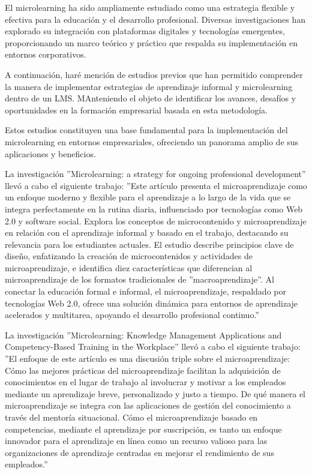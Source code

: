 
El microlearning ha sido ampliamente estudiado como una estrategia flexible y
efectiva para la educación y el desarrollo profesional. Diversas investigaciones
han explorado su integración con plataformas digitales y tecnologías emergentes,
proporcionando un marco teórico y práctico que respalda su implementación en
entornos corporativos.

A continuación, haré mención de estudios previos que han permitido comprender la
manera de implementar estrategias de aprendizaje informal y microlearning dentro
de un LMS. MAnteniendo el objeto de identificar los avances, desafíos y
oportunidades en la formación empresarial basada en esta metodología.

Estos estudios constituyen una base fundamental para la implementación del
microlearning en entornos empresariales, ofreciendo un panorama amplio de sus
aplicaciones y beneficios.

La investigación ''Microlearning: a strategy for ongoing professional
development'' llevó a cabo el siguiente trabajo: ''Este artículo presenta el
microaprendizaje como un enfoque moderno y flexible para el aprendizaje a lo
largo de la vida que se integra perfectamente en la rutina diaria, influenciado
por tecnologías como Web 2.0 y software social. Explora los conceptos de
microcontenido y microaprendizaje en relación con el aprendizaje informal y
basado en el trabajo, destacando su relevancia para los estudiantes actuales. El
estudio describe principios clave de diseño, enfatizando la creación de
microcontenidos y actividades de microaprendizaje, e identifica diez
características que diferencian al microaprendizaje de los formatos
tradicionales de ''macroaprendizaje''. Al conectar la educación formal e informal,
el microaprendizaje, respaldado por tecnologías Web 2.0, ofrece una solución
dinámica para entornos de aprendizaje acelerados y multitarea, apoyando el
desarrollo profesional continuo.''
\cite{article:microlearning_buchem}

La investigación ''Microlearning: Knowledge Management Applications and
Competency-Based Training in the Workplace'' llevó a cabo el siguiente trabajo:
''El enfoque de este artículo es una discusión triple sobre el microaprendizaje:
Cómo las mejores prácticas del microaprendizaje facilitan la adquisición de
conocimientos en el lugar de trabajo al involucrar y motivar a los empleados
mediante un aprendizaje breve, personalizado y justo a tiempo.
De qué manera el microaprendizaje se integra con las aplicaciones de gestión del
conocimiento a través del mentoría situacional.
Cómo el microaprendizaje basado en competencias, mediante el aprendizaje por
suscripción, es tanto un enfoque innovador para el aprendizaje en línea como un
recurso valioso para las organizaciones de aprendizaje centradas en mejorar el
rendimiento de sus empleados.''
\cite{article:microlearning_emerson}


